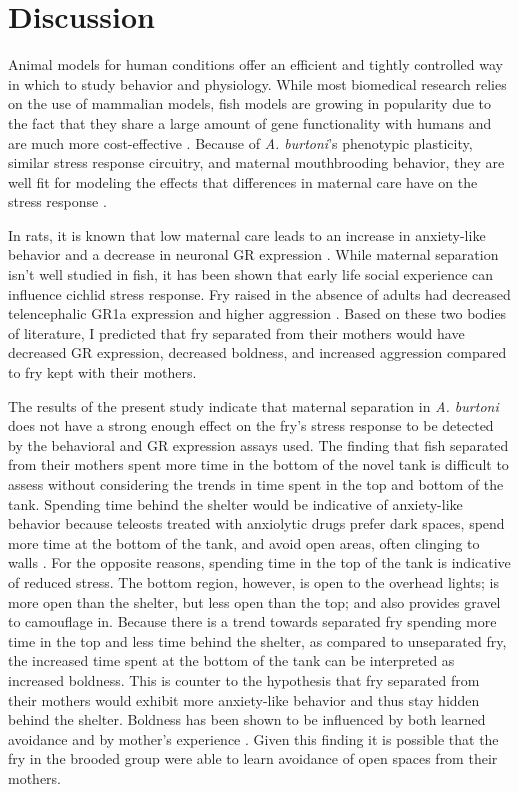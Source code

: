 \documentclass[12pt,twoside]{reedthesis}
\begin{document}
\chapter{Discussion}

Animal models for human conditions offer an efficient and tightly controlled way
in which to study behavior and physiology. While most biomedical research
relies on the use of mammalian models, fish models are growing in popularity due to
the fact that they share a large amount of gene
functionality with humans and are much more cost-effective
\citep{cech_cellular_2011}. 
Because of \textit{A. burtoni}'s phenotypic plasticity, similar stress
response circuitry, and maternal
mouthbrooding behavior, they are well fit for modeling the effects that
differences in maternal care have on the stress response
\citep{greenwood_multiple_2003, pijanowski_activity_2015, renn_fish_2008}.

In rats, it is known that low
maternal care leads to an increase in anxiety-like behavior and a decrease
in neuronal GR expression \citep{caldji_maternal_1998}. While maternal
separation isn't well studied in fish, it has been shown that early life
social experience can influence cichlid stress response. Fry raised in the
absence of adults had decreased telencephalic GR1a expression and higher
aggression \citep{nyman_effect_2017, arnold_social_2010}.  Based on these two bodies of literature, I predicted
that fry separated from their mothers would have decreased GR expression,
decreased boldness, and increased aggression compared to fry kept with their mothers. 

The results of the present study indicate that maternal separation in \textit{A.
burtoni} does not have a strong enough effect on the fry's stress response to be
detected by the behavioral and GR expression assays used. The finding that fish separated from their mothers spent more time in the bottom of the novel
tank is difficult to assess without considering the trends in time spent in the
top and bottom of the tank. Spending time behind the shelter would be
indicative of anxiety-like behavior because teleosts treated with anxiolytic
drugs prefer dark spaces, spend more time at the bottom of the tank, and avoid
open areas, often clinging to walls \citep{Gould2011, neumeister_socially_2017,
  ansai_chronic_2016, norton_three-spined_2019, ghisleni_role_2012}. For the opposite reasons, spending time in the top of the
tank is indicative of reduced stress. The bottom region, however, is open to the
overhead lights; is more open than the shelter, but less open than the top; and also provides gravel to
camouflage in. Because there is a trend towards separated fry spending more time in the top
and less time behind the shelter, as compared to unseparated fry, the increased
time spent at the bottom of the tank can be interpreted as increased 
boldness. This is counter to the hypothesis that
fry separated from their mothers would exhibit more anxiety-like behavior and
thus stay hidden behind the shelter. Boldness has been shown to be influenced by
both learned avoidance and by mother's experience \citep{brown_heritable_2007}.
Given this finding it is possible that the fry in
the brooded group were able to learn avoidance of open spaces from their mothers. 
\end{document}
